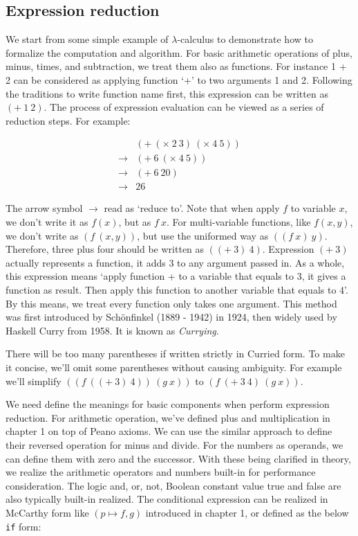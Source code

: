 \documentclass{article}
\begin{document}
\subsection{Expression reduction}

We start from some simple example of $\lambda$-calculus to demonstrate how to formalize the computation and algorithm. For basic arithmetic operations of plus, minus, times, and subtraction, we treat them also as functions. For instance 1 + 2 can be considered as applying function `+' to two arguments 1 and 2. Following the traditions to write function name first, this expression can be written as $(+\ 1\ 2)$. The process of expression evaluation can be viewed as a series of reduction steps. For example:

\[
\begin{array}{ll}
    & (+\ (\times\ 2\ 3)\ (\times\ 4\ 5)) \\
\to & (+\ 6\ (\times\ 4\ 5)) \\
\to & (+\ 6\ 20) \\
\to & 26
\end{array}
\]

The arrow symbol $\to$ read as `reduce to'. Note that when apply $f$ to variable $x$, we don't write it as $f(x)$, but as $f\ x$. For multi-variable functions, like $f(x, y)$, we don't write as $(f\ (x, y))$, but use the uniformed way as $((f\ x)\ y)$. Therefore, three plus four should be written as $((+\ 3)\ 4)$. Expression $(+\ 3)$ actually represents a function, it adds 3 to any argument passed in. As a whole, this expression means `apply function + to a variable that equals to 3, it gives a function as result. Then apply this function to another variable that equals to 4'. By this means, we treat every function only takes one argument. This method was first introduced by Schönfinkel (1889 - 1942) in 1924, then widely used by Haskell Curry from 1958. It is known as {\em Currying}\cite{SPJ1987}.

There will be too many parentheses if written strictly in Curried form. To make it concise, we'll omit some parentheses without causing ambiguity. For example we'll simplify $((f\ ((+\ 3)\ 4))\ (g\ x))$ to $(f\ (+\ 3\ 4)\ (g\ x))$.

We need define the meanings for basic components when perform expression reduction. For arithmetic operation, we've defined plus and multiplication in chapter 1 on top of Peano axioms. We can use the similar approach to define their reversed operation for minus and divide. For the numbers as operands, we can define them with zero and the successor. With these being clarified in theory, we realize the arithmetic operators and numbers built-in for performance consideration. The logic and, or, not, Boolean constant value true and false are also typically built-in realized. The conditional expression can be realized in McCarthy form like $(p \mapsto f, g)$ introduced in chapter 1, or defined as the below \texttt{if} form:
\end{document}
